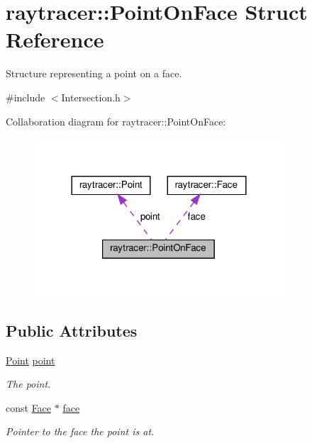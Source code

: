 \hypertarget{structraytracer_1_1PointOnFace}{}\section{raytracer\+:\+:Point\+On\+Face Struct Reference}
\label{structraytracer_1_1PointOnFace}


Structure representing a point on a face.  




{\ttfamily \#include $<$Intersection.\+h$>$}



Collaboration diagram for raytracer\+:\+:Point\+On\+Face\+:
\nopagebreak
\begin{figure}[H]
\begin{center}
\leavevmode
\includegraphics[width=264pt]{structraytracer_1_1PointOnFace__coll__graph}
\end{center}
\end{figure}
\subsection*{Public Attributes}
\begin{DoxyCompactItemize}
\item 
\mbox{\label{structraytracer_1_1PointOnFace_a74a307612b3b86cabe4b1d5f618510e6}} 
\hyperlink{classraytracer_1_1Point}{Point} \hyperlink{structraytracer_1_1PointOnFace_a74a307612b3b86cabe4b1d5f618510e6}{point}
\begin{DoxyCompactList}\small\item\em The point. \end{DoxyCompactList}\item 
\mbox{\label{structraytracer_1_1PointOnFace_afa20686364ca66cea1c3997d4d136cea}} 
const \hyperlink{classraytracer_1_1Face}{Face} $\ast$ \hyperlink{structraytracer_1_1PointOnFace_afa20686364ca66cea1c3997d4d136cea}{face}
\begin{DoxyCompactList}\small\item\em Pointer to the face the point is at. \end{DoxyCompactList}\end{DoxyCompactItemize}


